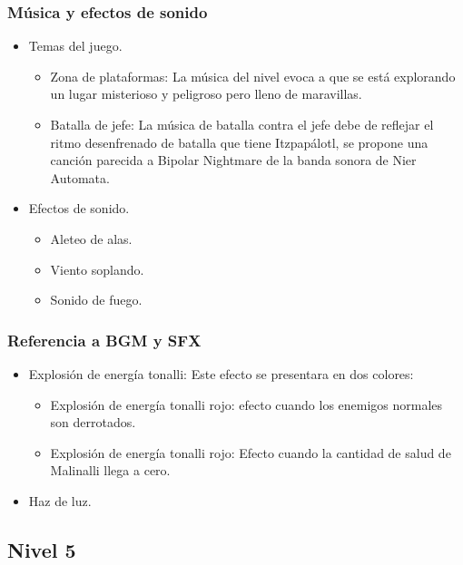 \documentclass[11pt,letterpaper]{article}
\begin{document}
\begin{itemize}
        \subsubsection{Música y efectos de sonido}
                \begin{itemize}
                        \item Temas del juego.
                \begin{itemize}
                        \item Zona de plataformas: La música del nivel evoca a que se está explorando un lugar misterioso y peligroso pero lleno de maravillas.
				\item Batalla de jefe: La música de batalla contra el jefe debe de reflejar el ritmo desenfrenado de batalla que tiene Itzpapálotl, se propone una canción parecida a Bipolar Nightmare de la banda sonora de Nier Automata.
                \end{itemize}
				\item Efectos de sonido.
                \begin{itemize}
                        \item Aleteo de alas.
                        \item Viento soplando.
                        \item Sonido de fuego.				
                \end{itemize}
                \end{itemize}

        \subsubsection{Referencia a BGM y SFX}
\begin{itemize}
        \item Explosión de energía tonalli: Este efecto se presentara en dos colores:
        \begin{itemize}
                \item Explosión de energía tonalli rojo: efecto cuando los enemigos normales son derrotados.
                \item Explosión de energía tonalli rojo: Efecto cuando la cantidad de salud de Malinalli llega a cero.
        \end{itemize}
        \item Haz de luz.
\end{itemize}


	
	
\subsection{Nivel 5}

\end{itemize}
\end{document}
